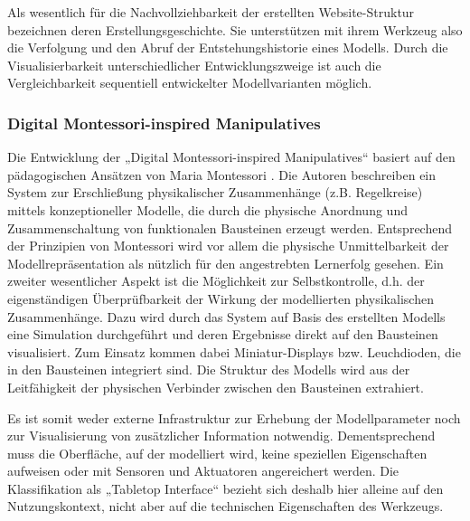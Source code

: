 Als wesentlich für die Nachvollziehbarkeit der erstellten Website-Struktur bezeichnen \citet{Klemmer02} deren Erstellungsgeschichte. Sie unterstützen mit ihrem Werkzeug also die Verfolgung und den Abruf der Entstehungshistorie eines Modells. Durch die Visualisierbarkeit unterschiedlicher Entwicklungszweige ist auch die Vergleichbarkeit sequentiell entwickelter Modellvarianten möglich. 


\subsubsection{Digital Montessori-inspired Manipulatives} %
\label{ssub:digital_montessori_inspired_manipulatives}

Die Entwicklung der „Digital Montessori-inspired Manipulatives“ \citep{Zuckerman05} basiert auf den pädagogischen Ansätzen von Maria Montessori \citep{Montessori05}. Die Autoren beschreiben ein System zur Erschließung physikalischer Zusammenhänge (z.B. Regelkreise) mittels konzeptioneller Modelle, die durch die physische Anordnung und Zusammenschaltung von funktionalen Bausteinen erzeugt werden. Entsprechend der Prinzipien von Montessori wird vor allem die physische Unmittelbarkeit der Modellrepräsentation als nützlich für den angestrebten Lernerfolg gesehen. Ein zweiter wesentlicher Aspekt ist die Möglichkeit zur Selbstkontrolle, d.h. der eigenständigen Überprüfbarkeit der Wirkung der modellierten physikalischen Zusammenhänge. Dazu wird durch das System auf Basis des erstellten Modells eine Simulation durchgeführt und deren Ergebnisse direkt auf den Bausteinen visualisiert. Zum Einsatz kommen dabei Miniatur-Displays bzw. Leuchdioden, die in den Bausteinen integriert sind. Die Struktur des Modells wird aus der Leitfähigkeit der physischen Verbinder zwischen den Bausteinen extrahiert. 

Es ist somit weder externe Infrastruktur zur Erhebung der Modellparameter noch zur Visualisierung von zusätzlicher Information notwendig. Dementsprechend muss die Oberfläche, auf der modelliert wird, keine speziellen Eigenschaften aufweisen oder mit Sensoren und Aktuatoren angereichert werden. Die Klassifikation als „Tabletop Interface“ bezieht sich deshalb hier alleine auf den Nutzungskontext, nicht aber auf die technischen Eigenschaften des Werkzeugs. 


